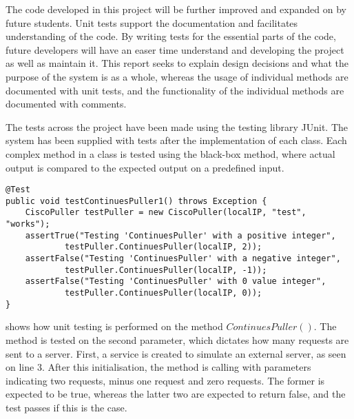 The code developed in this project will be further improved and expanded on by future students. Unit tests support the documentation and facilitates understanding of the code.
By writing tests for the essential parts of the code, future developers will have an easer time understand and developing the project as well as maintain it. 
This report seeks to explain design decisions and what the purpose of the system is as a whole, whereas the usage of individual methods are documented with unit tests, and the functionality of the individual methods are documented with comments.

The tests across the project have been made using the testing library JUnit\cite{junit4}. The system has been supplied with tests after the implementation of each class. Each complex method in a class is tested using the black-box method, where actual output is compared to the expected output on a predefined input.

\begin{lstlisting}[caption={Testing ContinuesPuller},label={lst:test_continuespuller},language=inc_Java, mathescape]
@Test
public void testContinuesPuller1() throws Exception {
    CiscoPuller testPuller = new CiscoPuller(localIP, "test", "works");
    assertTrue("Testing 'ContinuesPuller' with a positive integer",
            testPuller.ContinuesPuller(localIP, 2));
    assertFalse("Testing 'ContinuesPuller' with a negative integer",
            testPuller.ContinuesPuller(localIP, -1));
    assertFalse("Testing 'ContinuesPuller' with 0 value integer",
            testPuller.ContinuesPuller(localIP, 0));
}
\end{lstlisting}
 shows how unit testing is performed on the method $ContinuesPuller()$. The method is tested on the second parameter, which dictates how many requests are sent to a server. First, a service is created to simulate an external server, as seen on line 3. After this initialisation, the method is calling with parameters indicating two requests, minus one request and zero requests. The former is expected to be true, whereas the latter two are expected to return false, and the test passes if this is the case. 
